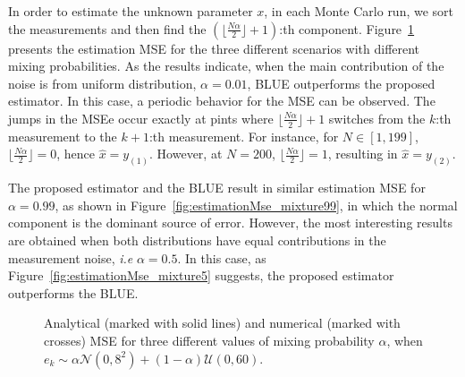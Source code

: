 \documentclass{article}
\begin{document}
In order to estimate the unknown parameter $x$, in each Monte Carlo run, we sort the measurements and then find the $(\lfloor\frac{N\alpha}{2}\rfloor+1)$:th component. Figure~\ref{fig:mixture_order} presents the estimation MSE for the three different scenarios with different mixing probabilities. As the results indicate, when the main contribution of the noise is from uniform distribution, $\alpha=0.01$, BLUE outperforms the proposed estimator.  In this case, a periodic behavior for the MSE can be observed. The jumps in the MSEe occur exactly at pints where $\lfloor\frac{N\alpha}{2}\rfloor+1$ switches from the $k$:th measurement to the $k+1$:th measurement. For instance, for $N\in[1,199]$, $\lfloor\frac{N\alpha}{2}\rfloor=0$, hence $\hat{x}=y_{(1)}$. However, at $N=200$, $\lfloor\frac{N\alpha}{2}\rfloor=1$, resulting in $\hat{x}=y_{(2)}$. 

The proposed estimator and the BLUE result in similar estimation MSE for $\alpha=0.99$, as shown in Figure~\ref{fig:estimationMse_mixture99}, in which the normal component is the dominant source of error. However, the most interesting results are obtained when both distributions have equal contributions in the measurement noise, {\em i.e} $\alpha=0.5$. In this case, as Figure~\ref{fig:estimationMse_mixture5} suggests, the proposed estimator outperforms the BLUE.
%
%
\begin{figure}[]
	\centering
	\hfil
		\hfil
	\caption{Analytical (marked with solid lines) and numerical (marked with crosses) MSE for three different values of mixing probability $\alpha$, when $e_k\sim \alpha\mathcal{N}(0,8^2) + (1-\alpha)\mathcal{U}(0,60)$.}
	\label{fig:mixture_order}
\end{figure}
%
%
\end{document}
